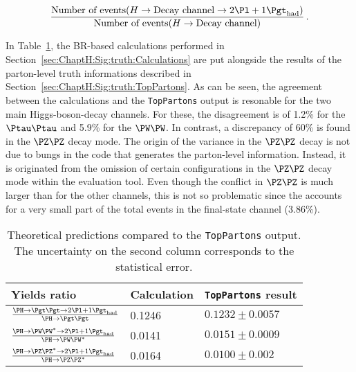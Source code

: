 \begin{equation*}
    \frac{\text{Number of events}(H \rightarrow \text{Decay channel} \rightarrow  \dileptau)}{\text{Number of events}(H \rightarrow \text{Decay channel)}}\, .
\end{equation*}

In Table~\ref{tab:ChaptH:Prediction_VS_TopPartons}, the BR-based calculations
performed in Section~\ref{sec:ChaptH:Sig:truth:Calculations} are put alongside 
the results of the parton-level truth informations described in Section~\ref{sec:ChaptH:Sig:truth:TopPartons}.
As can be seen, the agreement between the calculations and the \texttt{TopPartons} output is resonable for
the two main Higgs-boson-decay channels. For these, the disagreement is of 1.2\% for the $\Ptau\Ptau$  and 
5.9\% for the $\PW \PW$. 
In contrast, a discrepancy of 60\% is found in the $\PZ \PZ$ decay mode. 
The origin of the variance in the $\PZ \PZ$ decay is not due to bungs in the code
that generates the parton-level information. Instead, it is originated from the omission
of certain configurations in the $\PZ \PZ$ decay mode within the evaluation tool.
Even though the conflict in $\PZ \PZ$ is much larger than for the other channels, this is not so problematic
since the \HZZ accounts for a very small part of the total \tHq events in the \dileptau final-state channel  (3.86\%). 


\begin{table}[h]
\centering
\begin{tabular}{l|l|l}
\toprule
Yields ratio								&   Calculation   	& \texttt{TopPartons} result \\
\midrule
$\frac{\Htautau \rightarrow \dileptau }{\Htautau}$  	&   0.1246         	&  $0.1232  \pm 0.0057$ 	\\ 
$\frac{\HWW 	\rightarrow \dileptau}{\HWW}$       	&   0.0141        		&  $0.0151  \pm 0.0009$   \\ 
$\frac{\HZZ 	\rightarrow \dileptau }{\HZZ}$           	&   0.0164         	&  $0.0100  \pm 0.002$     \\ \bottomrule
\end{tabular}
\caption{Theoretical predictions compared to the \texttt{TopPartons} output. 
The uncertainty on the second column corresponds to the statistical error. }
\label{tab:ChaptH:Prediction_VS_TopPartons}
\end{table}

